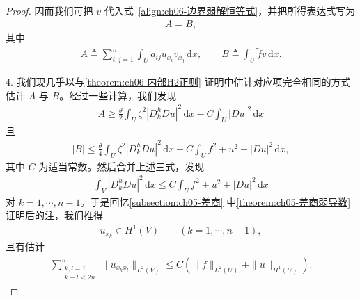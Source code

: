 \documentclass[../../main.tex]{subfiles}
\begin{document}
\begin{proof}
因而我们可把 $v$ 代入式~\eqref{align:ch06-边界弱解恒等式}，并把所得表达式写为
\begin{align}
A=B,
\end{align}
其中
\begin{align*}
A\triangleq\sum_{i,j=1}^{n}\int_{U}a_{ij}u_{x_{i}}v_{x_{j}}\,\mathrm{d}x,\qquad
B\triangleq\int_{U}\widetilde{f}v\,\mathrm{d}x.
\end{align*}

4. 我们现几乎以与\cref{theorem:ch06-内部H2正则} 证明中估计对应项完全相同的方式估计 $A$ 与 $B$。经过一些计算，我们发现
\begin{align}
A\geqslant\frac{\theta}{2}\int_{U}\zeta^{2}|D_{k}^{h}Du|^{2}\,\mathrm{d}x-C\int_{U}|Du|^{2}\,\mathrm{d}x
\end{align}
且
\begin{align}
|B|\leqslant\frac{\theta}{4}\int_{U}\zeta^{2}|D_{k}^{h}Du|^{2}\,\mathrm{d}x+C\int_{U}f^{2}+u^{2}+|Du|^{2}\,\mathrm{d}x,
\end{align}
其中 $C$ 为适当常数。然后合并上述三式，发现
\begin{align*}
\int_{V}|D_{k}^{h}Du|^{2}\,\mathrm{d}x\leqslant C\int_{U}f^{2}+u^{2}+|Du|^{2}\,\mathrm{d}x
\end{align*}
对 $k=1,\cdots,n-1$。于是回忆\cref{subsection:ch05-差商} 中\cref{theorem:ch05-差商弱导数} 证明后的注，我们推得
\begin{align}
u_{x_{k}}\in H^{1}(V)\qquad (k=1,\cdots,n-1),
\end{align}
且有估计
\begin{align}
\sum_{\substack{k,l=1\\ k+l<2n}}^{n}\|u_{x_{k}x_{l}}\|_{L^{2}(V)}\leqslant C(\|f\|_{L^{2}(U)}+\|u\|_{H^{1}(U)}).
\end{align}


\end{proof}
\end{document}
